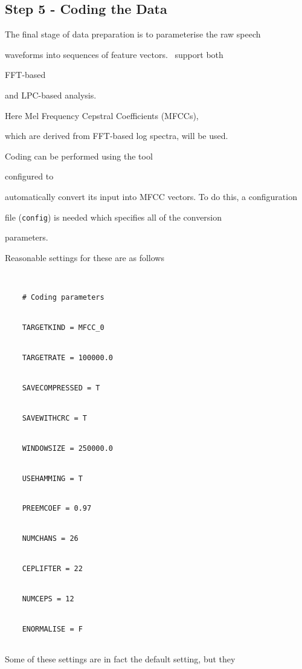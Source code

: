 \subsection{Step 5 - Coding the Data}





The final stage of data preparation is to parameterise the raw speech


waveforms into sequences of feature vectors.  \HTK\ support both 


FFT-based


and LPC-based analysis.  


Here Mel Frequency Cepstral Coefficients (MFCCs),


which are derived from FFT-based log spectra, will be used.





Coding can be performed using the tool  


configured to


automatically convert its input into MFCC vectors.  To do this, a configuration


file (\texttt{config}) is needed which specifies all of the conversion 


parameters. 


Reasonable settings for these are as follows


\begin{verbatim}


    # Coding parameters


    TARGETKIND = MFCC_0


    TARGETRATE = 100000.0


    SAVECOMPRESSED = T


    SAVEWITHCRC = T


    WINDOWSIZE = 250000.0


    USEHAMMING = T


    PREEMCOEF = 0.97


    NUMCHANS = 26


    CEPLIFTER = 22


    NUMCEPS = 12


    ENORMALISE = F


\end{verbatim}


Some of these settings are in fact the default setting, but they


